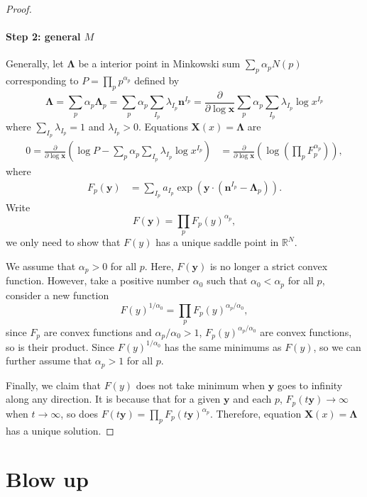 \documentclass[12pt]{article}
\theoremstyle{definition}
\theoremstyle{plain}
\begin{document}
\begin{proof}
\paragraph{Step 2: general $M$}
Generally, let $\mathbf{\Lambda}$ be a interior point in Minkowski sum $\sum_p \alpha_p N(p)$ corresponding to $P=\prod_p p^{\alpha_p}$ defined by 
\[
	\mathbf{\Lambda}
	=\sum_p \alpha_p \mathbf{\Lambda}_p
	=\sum_p \alpha_p \sum_{I_p}\lambda_{I_p}\mathbf{n}^{I_p}
	=\frac{\partial}{\partial \log \mathbf{x}}\sum_{p}\alpha_p\sum_{I_p}\lambda_{I_p} \log x^{I_p}
\]
where $\sum_{I_p} \lambda_{I_p}=1$ and $\lambda_{I_p} > 0$. Equations $\mathbf{X}(x)=\mathbf{\Lambda}$ are 
\[
\begin{aligned}
	0=\frac{\partial }{\partial \log \mathbf{x}}\left(
	\log P-\sum_{p}\alpha_p\sum_{I_p}\lambda_{I_p} \log x^{I_p}
	\right)&=\frac{\partial }{\partial \log \mathbf{x}}\left(
	\log \left(\prod_p F_p^{\alpha_p}\right)
	\right),
\end{aligned}
\]
where
\[
	\begin{aligned}
		F_p(\mathbf y)&=\sum_{I_p} a_{I_p} \exp\left(\mathbf{y}\cdot \left(\mathbf{n}^{I_p}-\mathbf{\Lambda}_p\right)\right).
	\end{aligned}
\]
Write
\[
	F(\mathbf y)=\prod_p F_p(y)^{\alpha_p},
\]
we only need to show that $F(y)$ has a unique saddle point in $\mathbb R^N$.

We assume that $\alpha_p>0$ for all $p$. Here, $F(\mathbf y)$ is no longer a strict convex function. However, take a positive number $\alpha_0$ such that $\alpha_0< \alpha_p$ for all $p$, consider a new function
\[
	F(y)^{1/\alpha_0}=\prod_p F_p(y)^{\alpha_p/\alpha_0},
\]
since $F_p$ are convex functions and $\alpha_p/\alpha_0>1$, $F_p(y)^{\alpha_p/\alpha_0}$ are convex functions, so is their product. Since $F(y)^{1/\alpha_0}$ has the same minimums as $F(y)$, so we can further assume that $\alpha_p>1$ for all $p$.

Finally, we claim that $F(y)$ does not take minimum when $\mathbf{y}$ goes to infinity along any direction. It is because that for a given $\mathbf{y}$ and each $p$, $F_p(t\mathbf{y})\to \infty$ when $t\to \infty$, so does $F(t\mathbf{y})=\prod_p F_p(t\mathbf{y})^{\alpha_p}$. Therefore, equation $\mathbf{X}(x)=\mathbf{\Lambda}$ has a unique solution.

\end{proof}

\section{Blow up}
\end{document}
